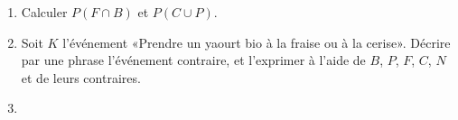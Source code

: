 \begin{exercice}
\begin{enumerate}
        \item

            Calculer \( P(F\cap B)\) et \( P(C\cup P)\).
        \item
            Soit \( K\) l'événement «Prendre un yaourt bio à la fraise ou à la cerise». Décrire par une phrase l'événement contraire, et l'exprimer à l'aide de \( B\), \( P\), \( F\), \( C\), \( N\) et de leurs contraires.
        \item

    \end{enumerate}

\end{exercice}
